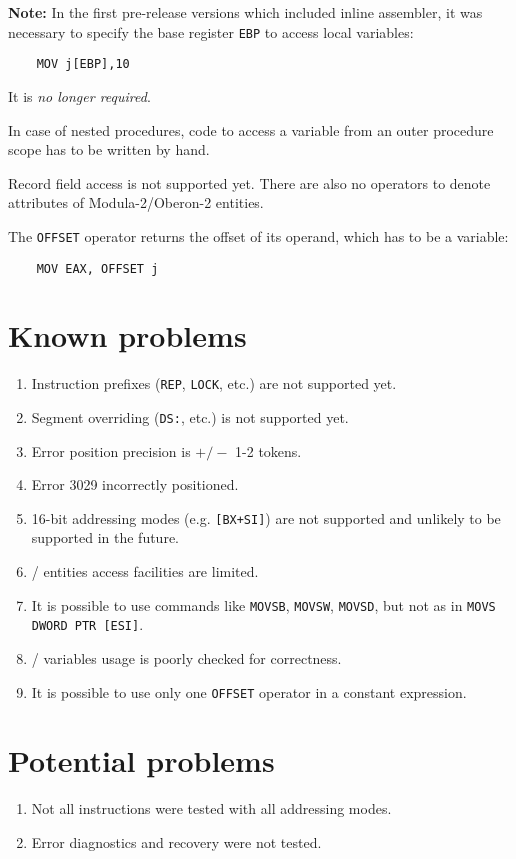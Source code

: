 {\bf Note:} In the first pre-release versions which included inline assembler,
it was necessary to specify the base register \verb'EBP' to access local variables:

\verb'    MOV j[EBP],10'

It is {\it no longer required}.

In case of nested procedures, code to access a variable from an outer procedure scope
has to be written by hand.

Record field access is not supported yet. %
There are also no operators to denote attributes of Modula-2/Oberon-2 entities.

The \verb'OFFSET' operator returns the offset of its operand, which has to be a variable:

\verb'    MOV EAX, OFFSET j'

\section{Known problems}
\label{asm:problems}

\begin{enumerate}
\item Instruction prefixes (\verb'REP', \verb'LOCK', etc.) are not supported yet.
\item Segment overriding (\verb'DS:', etc.) is not supported yet.
\item Error position precision is $+/-$ 1-2 tokens.
\item Error 3029 incorrectly positioned.
\item 16-bit addressing modes (e.g. \verb'[BX+SI]') are not supported and
      unlikely to be supported in the future.
\item \mt{}/\ot{} entities access facilities are limited.
\item It is possible to use commands like \verb'MOVSB', \verb'MOVSW', \verb'MOVSD',
      but not as in \verb'MOVS DWORD PTR [ESI]'.
\item \mt{}/\ot{} variables usage is poorly checked for correctness.
\item It is possible to use only one \verb'OFFSET' operator in a constant expression.
\end{enumerate}

\section{Potential problems}

\begin{enumerate}
\item Not all instructions were tested with all addressing modes.
\item Error diagnostics and recovery were not tested.
\end{enumerate}

